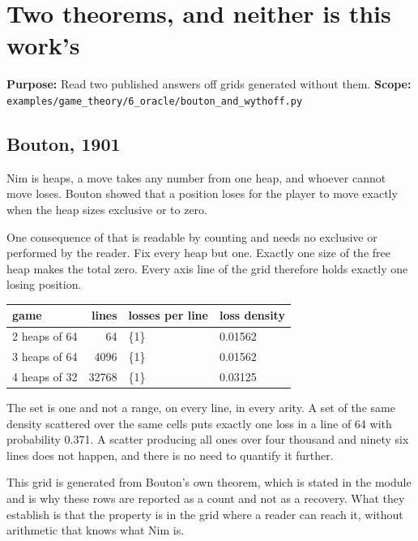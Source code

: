 \chapter{Two theorems, and neither is this work's}

\textbf{Purpose:} Read two published answers off grids generated without them. \textbf{Scope:}
\texttt{examples/\allowbreak{}game\_\allowbreak{}theory/\allowbreak{}6\_\allowbreak{}oracle/\allowbreak{}bouton\_\allowbreak{}and\_\allowbreak{}wythoff.\allowbreak{}py}

\section{Bouton, 1901}

Nim is heaps, a move takes any number from one heap, and whoever cannot move loses. Bouton showed
that a position loses for the player to move exactly when the heap sizes exclusive or to zero.

One consequence of that is readable by counting and needs no exclusive or performed by the reader.
Fix every heap but one. Exactly one size of the free heap makes the total zero. Every axis line of the
grid therefore holds exactly one losing position.

\begin{center}
\begin{tabular}{@{}lrll@{}}
\toprule
game & lines & losses per line & loss density \\
\midrule
2 heaps of 64 & 64 & \{1\} & 0.01562 \\
3 heaps of 64 & 4096 & \{1\} & 0.01562 \\
4 heaps of 32 & 32768 & \{1\} & 0.03125 \\
\bottomrule
\end{tabular}
\end{center}

The set is one and not a range, on every line, in every arity. A set of the same density scattered
over the same cells puts exactly one loss in a line of 64 with probability 0.371. A scatter
producing all ones over four thousand and ninety six lines does not happen, and there is no need to
quantify it further.

This grid is generated from Bouton's own theorem, which is stated in the module and is why these
rows are reported as a count and not as a recovery. What they establish is that the property is in
the grid where a reader can reach it, without arithmetic that knows what Nim is.

